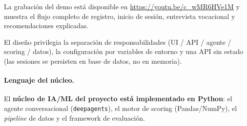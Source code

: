 La grabaci\'on del demo est\'a disponible en
\url{https://youtu.be/c_wMR6HVe1M} y muestra el flujo completo de registro,
inicio de sesi\'on, entrevista vocacional y recomendaciones explicadas.

El dise\~no privilegia la separaci\'on de responsabilidades (UI / API /
agente / scoring / datos), la configuraci\'on por variables de entorno y una
API sin estado (las sesiones se persisten en base de datos, no en memoria).

\paragraph{Lenguaje del n\'ucleo.} El \textbf{n\'ucleo de IA/ML del proyecto est\'a
implementado en Python}: el agente conversacional (\texttt{deepagents}), el motor
de scoring (Pandas/NumPy), el \emph{pipeline} de datos y el framework de
evaluaci\'on.

